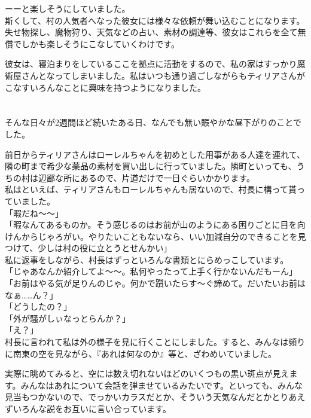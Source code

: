 \documentclass[oneside, a4paper]{jsbook}
\begin{document}
ーーと楽しそうにしていました。\\

斯くして、村の人気者へなった彼女には様々な依頼が舞い込むことになります。失せ物探し、魔物狩り、天気などの占い、素材の調達等、彼女はこれらを全て無償でしかも楽しそうにこなしていくわけです。

彼女は、寝泊まりをしているここを拠点に活動をするので、私の家はすっかり魔術屋さんとなってしまいました。私はいつも通り過ごしながらもティリアさんがこなすいろんなことに興味を持つようになりました。\\\\\\

そんな日々が2週間ほど続いたある日、なんでも無い賑やかな昼下がりのことでした。

前日からティリアさんはローレルちゃんを初めとした用事がある人達を連れて、隣の町まで希少な薬品の素材を買い出しに行っていました。隣町といっても、うちの村は辺鄙な所にあるので、片道だけで一日ぐらいかかります。\\

私はといえば、ティリアさんもローレルちゃんも居ないので、村長に構って貰っていました。\\

\noindent
「暇だね〜〜」\\
「暇なんてあるものか。そう感じるのはお前が山のようにある困りごとに目を向けんからじゃろがい。やりたいこともないなら、いい加減自分のできることを見つけて、少しは村の役に立とうとせんかい」\\

私に返事をしながら、村長はずっといろんな書類とにらめっこしています。\\

\noindent
「じゃあなんか紹介してよ〜〜。私何やったって上手く行かないんだもーん」\\
「お前はやる気が足りんのじゃ。何かで躓いたらす〜ぐ諦めて。だいたいお前はなぁ……ん？」\\
「どうしたの？」\\
「外が騒がしぃなっとらんか？」\\
「え？」\\

村長に言われて私は外の様子を見に行くことにしました。すると、みんなは頻りに南東の空を見ながら、『あれは何なのか』等と、ざわめいていました。

実際に眺めてみると、空には数え切れないほどのいくつもの黒い斑点が見えます。みんなはあれについて会話を弾ませているみたいです。といっても、みんな見当もつかないので、でっかいカラスだとか、そういう天気なんだとかとりあえずいろんな説をお互いに言い合っています。\\
\end{document}
